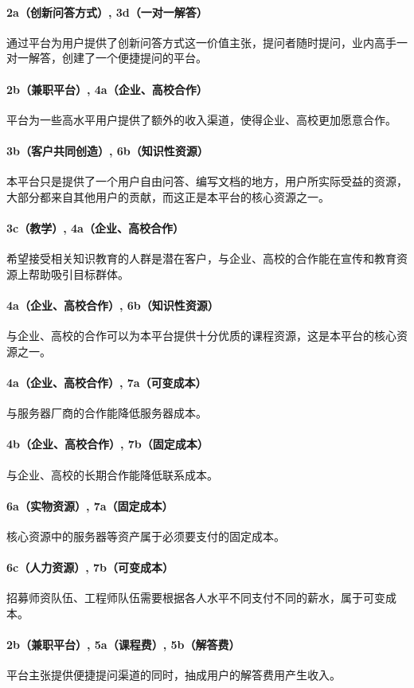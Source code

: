 \documentclass[a4paper]{ctexart}
\begin{document}
\paragraph{2a（创新问答方式）, 3d（一对一解答）}通过平台为用户提供了创新问答方式这一价值主张，提问者随时提问，业内高手一对一解答，创建了一个便捷提问的平台。
\paragraph{2b（兼职平台）, 4a（企业、高校合作）}平台为一些高水平用户提供了额外的收入渠道，使得企业、高校更加愿意合作。
\paragraph{3b（客户共同创造）, 6b（知识性资源）}本平台只是提供了一个用户自由问答、编写文档的地方，用户所实际受益的资源，大部分都来自其他用户的贡献，而这正是本平台的核心资源之一。
\paragraph{3c（教学）, 4a（企业、高校合作）}希望接受相关知识教育的人群是潜在客户，与企业、高校的合作能在宣传和教育资源上帮助吸引目标群体。
\paragraph{4a（企业、高校合作）, 6b（知识性资源）}与企业、高校的合作可以为本平台提供十分优质的课程资源，这是本平台的核心资源之一。
\paragraph{4a（企业、高校合作）, 7a（可变成本）}与服务器厂商的合作能降低服务器成本。
\paragraph{4b（企业、高校合作）, 7b（固定成本）}与企业、高校的长期合作能降低联系成本。
\paragraph{6a（实物资源）, 7a（固定成本）}核心资源中的服务器等资产属于必须要支付的固定成本。
\paragraph{6c（人力资源）, 7b（可变成本）}招募师资队伍、工程师队伍需要根据各人水平不同支付不同的薪水，属于可变成本。
\paragraph{2b（兼职平台）, 5a（课程费）, 5b（解答费）}平台主张提供便捷提问渠道的同时，抽成用户的解答费用产生收入。
\end{document}
